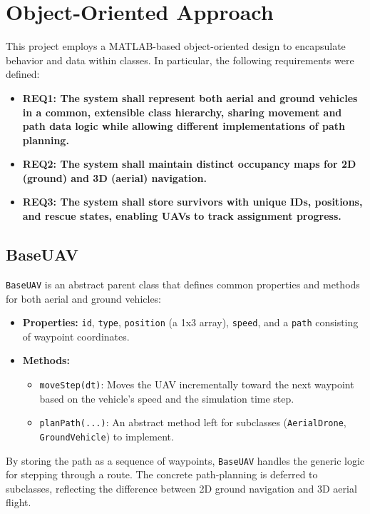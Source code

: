 \documentclass[12pt,a4paper]{report}
\begin{document}
\section{Object-Oriented Approach}
\label{sec:obj_approach}
This project employs a MATLAB-based object-oriented design to encapsulate behavior and data within
classes. In particular, the following requirements were defined:

\begin{itemize}
    \item \textbf{REQ1: The system shall represent both aerial and ground vehicles in a common, 
          extensible class hierarchy, sharing movement and path data logic while allowing different 
          implementations of path planning.}
    \item \textbf{REQ2: The system shall maintain distinct occupancy maps for 2D (ground) and 3D (aerial) 
          navigation.}
    \item \textbf{REQ3: The system shall store survivors with unique IDs, positions, and rescue states, 
          enabling UAVs to track assignment progress.}
\end{itemize}

\subsection{BaseUAV}
\label{sec:baseuav}
\texttt{BaseUAV} is an abstract parent class that defines common properties and methods for
both aerial and ground vehicles:

\begin{itemize}
    \item \textbf{Properties:} 
          \texttt{id}, \texttt{type}, \texttt{position} (a 1x3 array), \texttt{speed}, 
          and a \texttt{path} consisting of waypoint coordinates. 
    \item \textbf{Methods:}
        \begin{itemize}
            \item \texttt{moveStep(dt)}: Moves the UAV incrementally toward the next waypoint
                  based on the vehicle's speed and the simulation time step.
            \item \texttt{planPath(...)}: An abstract method left for subclasses
                  (\texttt{AerialDrone}, \texttt{GroundVehicle}) to implement.
        \end{itemize}
\end{itemize}

By storing the path as a sequence of waypoints, \texttt{BaseUAV} handles the generic logic for
stepping through a route. The concrete path-planning is deferred to subclasses, reflecting
the difference between 2D ground navigation and 3D aerial flight.
\end{document}
